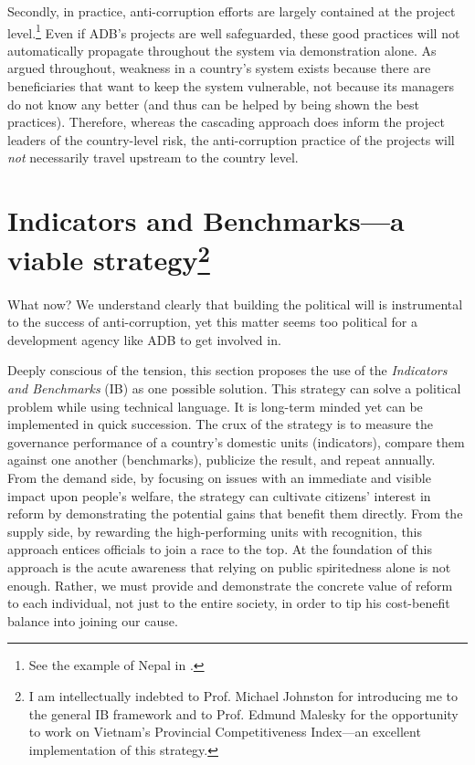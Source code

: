 \documentclass[12pt]{article}
\begin{document}
Secondly, in practice, anti-corruption efforts are largely contained at the project level.\footnote{See the example of Nepal in \citet[15]{ADB2013}.} Even if ADB's projects are well safeguarded, these good practices will not automatically propagate throughout the system via demonstration alone. As argued throughout, weakness in a country's system exists because there are beneficiaries that want to keep the system vulnerable, not because its managers do not know any better (and thus can be helped by being shown the best practices). Therefore, whereas the cascading approach does inform the project leaders of the country-level risk, the anti-corruption practice of the projects will \textit{not} necessarily travel upstream to the country level.

\section[Indicators and Benchmarks---a viable strategy]{Indicators and Benchmarks---a viable strategy\footnote{I am intellectually indebted to Prof. Michael Johnston for introducing me to the general IB framework and to Prof. Edmund Malesky for the opportunity to work on Vietnam's Provincial Competitiveness Index---an excellent implementation of this strategy.}}
\label{sec:IB}

What now? We understand clearly that building the political will is instrumental to the success of anti-corruption, yet this matter seems too political for a development agency like ADB to get involved in.

Deeply conscious of the tension, this section proposes the use of the \textit{Indicators and Benchmarks} (IB) as one possible solution. This strategy can solve a political problem while using technical language. It is long-term minded yet can be implemented in quick succession. The crux of the strategy is to measure the governance performance of a country's domestic units (indicators), compare them against one another (benchmarks), publicize the result, and repeat annually. From the demand side, by focusing on issues with an immediate and visible impact upon people's welfare, the strategy can cultivate citizens' interest in reform by demonstrating the potential gains that benefit them directly. From the supply side, by rewarding the high-performing units with recognition, this approach entices officials to join a race to the top. At the foundation of this approach is the acute awareness that relying on public spiritedness alone is not enough. Rather, we must provide and demonstrate the concrete value of reform to each individual, not just to the entire society, in order to tip his cost-benefit balance into joining our cause.
\end{document}
